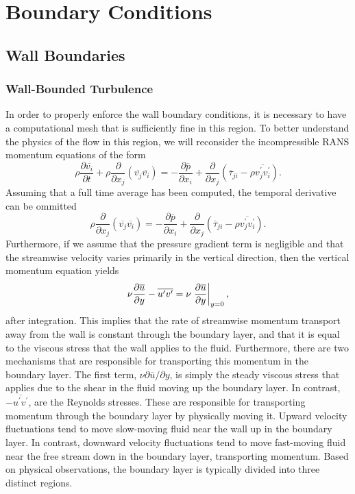 \chapter{Boundary Conditions}
\section{Wall Boundaries}
\subsection{Wall-Bounded Turbulence}
In order to properly enforce the wall boundary conditions, it is necessary to have a computational mesh that is sufficiently fine in this region. To better understand the physics of the flow in this region, we will reconsider the incompressible RANS momentum equations of the form
\begin{equation}
    \rho \frac{\partial \overline{v_i}}{\partial t} 
    + \rho  \frac{\partial}{\partial x_j} \left(\overline{v_j}\overline{v_i}\right)
    =- \frac{\partial \overline{p}}{\partial x_i} 
    + \frac{\partial}{\partial x_j} \left(\overline\tau_{ji} - \rho \overline{v_j^\prime v_i^\prime}\right).
\end{equation}
Assuming that a full time average has been computed, the temporal derivative can be ommitted
\begin{equation}
    \rho  \frac{\partial}{\partial x_j} \left(\overline{v_j}\overline{v_i}\right)
    =- \frac{\partial \overline{p}}{\partial x_i} 
    + \frac{\partial}{\partial x_j} \left(\overline\tau_{ji} - \rho \overline{v_j^\prime v_i^\prime}\right).
\end{equation}
Furthermore, if we assume that the pressure gradient term is negligible and that the streamwise velocity varies primarily in the vertical direction, then the vertical momentum equation yields
\begin{equation}
	\label{eqn:3nsi2039}
	\nu \frac{\partial \overline{u}}{\partial y} - \overline{u^\prime v^\prime} = \nu \left.\frac{\partial \overline{u}}{\partial y}\right\rvert_{y=0}^{},
\end{equation}
after integration. This implies that the rate of streamwise momentum transport away from the wall is constant through the boundary layer, and that it is equal to the viscous stress that the wall applies to the fluid. Furthermore, there are two mechanisms that are responsible for transporting this momentum in the boundary layer. The first term, $\nu \partial \overline{u}/\partial y$, is simply the steady viscous stress that applies due to the shear in the fluid moving up the boundary layer. In contrast, $-\overline{u^\prime v^\prime}$, are the Reynolds stresses. These are responsible for transporting momentum through the boundary layer by physically moving it. Upward velocity fluctuations tend to move slow-moving fluid near the wall up in the boundary layer. In contrast, downward velocity fluctuations tend to move fast-moving fluid near the free stream down in the boundary layer, transporting momentum. Based on physical observations, the boundary layer is typically divided into three distinct regions.
